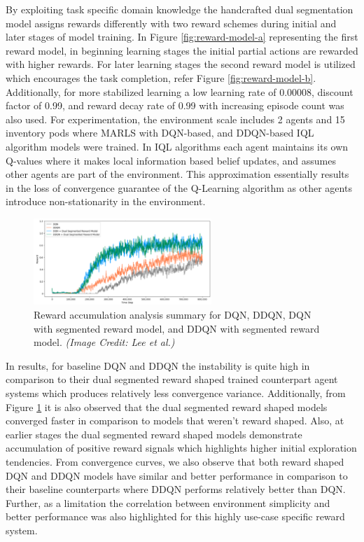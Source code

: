 \documentclass{article}
\begin{document}
By exploiting task specific domain knowledge the handcrafted dual segmentation model assigns rewards differently with two reward schemes during initial and later stages of model training.
In Figure \ref{fig:reward-model-a} representing the first reward model, in beginning learning stages the initial partial actions are rewarded with higher rewards.
For later learning stages the second reward model is utilized which encourages the task completion, refer Figure \ref{fig:reward-model-b}.
Additionally, for more stabilized learning a low learning rate of 0.00008, discount factor of 0.99, and reward decay rate of 0.99 with increasing episode count was also used.
For experimentation, the environment scale includes 2 agents and 15 inventory pods where MARLS with DQN-based, and DDQN-based IQL algorithm models were trained.
In IQL algorithms each agent maintains its own Q-values where it makes local information based belief updates, and assumes other agents are part of the environment.
This approximation essentially results in the loss of convergence guarantee of the Q-Learning algorithm as other agents introduce non-stationarity in the environment.


\begin{figure}[h]
    \centering
    \includegraphics[width=0.6\textwidth]{reward-shaping-result.png}
    \caption{Reward accumulation analysis summary for DQN, DDQN, DQN with segmented reward model, and DDQN with segmented reward model. \textit{(Image Credit: Lee et al.)}}
    \label{fig:reward-shaping-result}
\end{figure}


In results, for baseline DQN and DDQN the instability is quite high in comparison to their dual segmented reward shaped trained counterpart agent systems which produces relatively less convergence variance.
Additionally, from Figure \ref{fig:reward-shaping-result} it is also observed that the dual segmented reward shaped models converged faster in comparison to models that weren’t reward shaped.
Also, at earlier stages the dual segmented reward shaped models demonstrate accumulation of positive reward signals which highlights higher initial exploration tendencies.
From convergence curves, we also observe that both reward shaped DQN and DDQN models have similar and better performance in comparison to their baseline counterparts where DDQN performs relatively better than DQN.
Further, as a limitation the correlation between environment simplicity and better performance was also highlighted for this highly use-case specific reward system.
\end{document}
